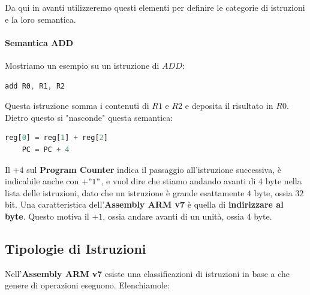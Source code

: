 \documentclass{article}
\begin{document}
Da qui in avanti utilizzeremo questi elementi per definire le categorie di istruzioni e la loro semantica.

\paragraph{Semantica ADD} Mostriamo un esempio su un istruzione di $ADD$:

\begin{lstlisting}[language = JavaScript]
    add R0, R1, R2
\end{lstlisting}
\vspace*{-20px}

Questa istruzione somma i contenuti di $R1$ e $R2$ e deposita il risultato in $R0$. Dietro questo si "nasconde" questa semantica:

\begin{lstlisting}[language = JavaScript]
    reg[0] = reg[1] + reg[2]
    PC = PC + 4
\end{lstlisting}
\vspace*{-20px}

Il $+4$ sul \textbf{Program Counter} indica il passaggio all'istruzione successiva, è indicabile anche con $ +"1" $, e vuol dire che stiamo andando avanti di $4$ byte nella lista delle istruzioni, dato che un istruzione è grande esattamente $4$ byte, ossia $32$ bit. Una caratteristica dell'\textbf{Assembly ARM v7} è quella di \textbf{indirizzare al byte}. Questo motiva il $+1$, ossia andare avanti di un unità, ossia 4 byte.

\newpage

\subsection{Tipologie di Istruzioni}

Nell'\textbf{Assembly ARM v7} esiste una classificazioni di istruzioni in base a che genere di operazioni eseguono. Elenchiamole:
\end{document}
